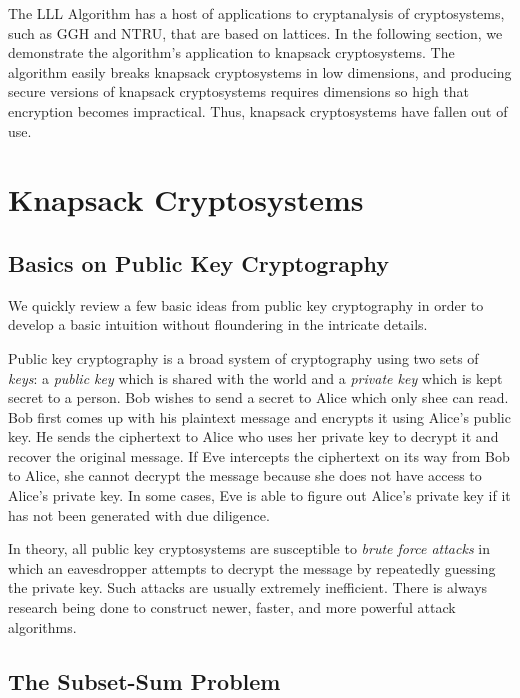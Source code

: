 \documentclass[a4paper,12pt]{article}
\begin{document}
The LLL Algorithm has a host of applications to cryptanalysis of cryptosystems, such as GGH and NTRU, that are based on lattices. In the following section, we demonstrate the algorithm's application to knapsack cryptosystems. The algorithm easily breaks knapsack cryptosystems in low dimensions, and producing secure versions of knapsack cryptosystems requires dimensions so high that encryption becomes impractical. Thus, knapsack cryptosystems have fallen out of use. 

\newpage

\section{Knapsack Cryptosystems}\label{Knapsack}

\subsection{Basics on Public Key Cryptography}
We quickly review a few basic ideas from public key cryptography in order to develop a basic intuition without floundering in the intricate details. 

Public key cryptography is a broad system of cryptography using two sets of \textit{keys}: a \textit{public key}  which is shared with the world and a \textit{private key} which is kept secret to a person. Bob wishes to send a secret to Alice which only shee can read. Bob first comes up with his plaintext message and encrypts it using Alice's public key. He sends the ciphertext to Alice who uses her private key to decrypt it and recover the original message. If Eve intercepts the ciphertext on its way from Bob to Alice, she cannot decrypt the message because she does not have access to Alice's private key. In some cases, Eve is able to figure out Alice's private key if it has not been generated with due diligence. 

In theory, all public key cryptosystems are susceptible to \textit{brute force attacks} in which an eavesdropper attempts to decrypt the message by repeatedly guessing the private key. Such attacks are usually extremely inefficient. There is always research being done to construct newer, faster, and more powerful attack algorithms.

\subsection{The Subset-Sum Problem}
\end{document}

